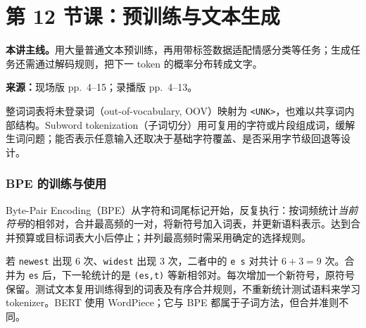 
\begingroup
\linespread{1.15}\selectfont
\setlength{\parskip}{0.4em}
\renewcommand{\recordid}[1]{}
\renewcommand{\relatedexercise}[2]{\hyperref[exercise:#1]{#2}}
\section{第 12 节课：预训练与文本生成}
\label{lecture:SC4002-L12}


\textbf{本讲主线。}用大量普通文本预训练，再用带标签数据适配情感分类等任务；生成任务还需通过解码规则，把下一 token 的概率分布转成文字。

\nopagebreak[4]
\textbf{来源：}现场版 pp.~4--15；录播版 pp.~4--13。

整词词表将未登录词（out-of-vocabulary, OOV）映射为 \texttt{<UNK>}，也难以共享词内部结构。Subword tokenization（子词切分）用可复用的字符或片段组成词，缓解生词问题；能否表示任意输入还取决于基础字符覆盖、是否采用字节级回退等设计。

\subsubsection{BPE 的训练与使用}

Byte-Pair Encoding（BPE）从字符和词尾标记开始，反复执行：按词频统计\emph{当前符号}的相邻对，合并最高频的一对，将新符号加入词表，并更新语料表示。达到合并预算或目标词表大小后停止；并列最高频时需采用确定的选择规则。

若 \texttt{newest} 出现 6 次、\texttt{widest} 出现 3 次，二者中的 \texttt{e s} 对共计 $6+3=9$ 次。合并为 \texttt{es} 后，下一轮统计的是 \texttt{(es,t)} 等新相邻对。每次增加一个新符号，原符号保留。测试文本复用训练得到的词表及有序合并规则，不重新统计测试语料来学习 tokenizer。BERT 使用 WordPiece；它与 BPE 都属于子词方法，但合并准则不同。

